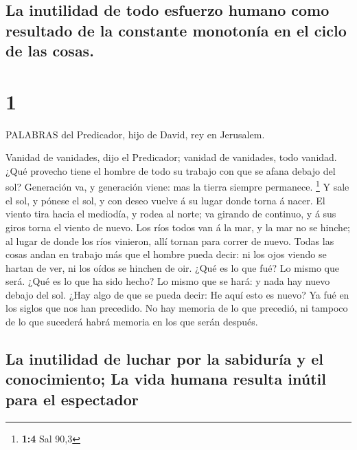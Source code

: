\hypertarget{la-inutilidad-de-todo-esfuerzo-humano-como-resultado-de-la-constante-monotonuxeda-en-el-ciclo-de-las-cosas.}{%
\subsection{La inutilidad de todo esfuerzo humano como resultado de la
constante monotonía en el ciclo de las
cosas.}\label{la-inutilidad-de-todo-esfuerzo-humano-como-resultado-de-la-constante-monotonuxeda-en-el-ciclo-de-las-cosas.}}

\hypertarget{section}{%
\section{1}\label{section}}

 PALABRAS del Predicador, hijo de David, rey en Jerusalem.

 Vanidad de vanidades, dijo el Predicador; vanidad de
vanidades, todo vanidad.  ¿Qué provecho tiene el hombre de
todo su trabajo con que se afana debajo del sol?  Generación
va, y generación viene: mas la tierra siempre permanece. \footnote{\textbf{1:4}
  Sal 90,3}  Y sale el sol, y pónese el sol, y con deseo
vuelve á su lugar donde torna á nacer.  El viento tira hacia
el mediodía, y rodea al norte; va girando de continuo, y á sus giros
torna el viento de nuevo.  Los ríos todos van á la mar, y la
mar no se hinche; al lugar de donde los ríos vinieron, allí tornan para
correr de nuevo.  Todas las cosas andan en trabajo más que
el hombre pueda decir: ni los ojos viendo se hartan de ver, ni los oídos
se hinchen de oir.  ¿Qué es lo que fué? Lo mismo que será.
¿Qué es lo que ha sido hecho? Lo mismo que se hará: y nada hay nuevo
debajo del sol.  ¿Hay algo de que se pueda decir: He aquí
esto es nuevo? Ya fué en los siglos que nos han precedido. 
No hay memoria de lo que precedió, ni tampoco de lo que sucederá habrá
memoria en los que serán después.

\hypertarget{la-inutilidad-de-luchar-por-la-sabiduruxeda-y-el-conocimiento-la-vida-humana-resulta-inuxfatil-para-el-espectador}{%
\subsection{La inutilidad de luchar por la sabiduría y el conocimiento;
La vida humana resulta inútil para el
espectador}\label{la-inutilidad-de-luchar-por-la-sabiduruxeda-y-el-conocimiento-la-vida-humana-resulta-inuxfatil-para-el-espectador}}

